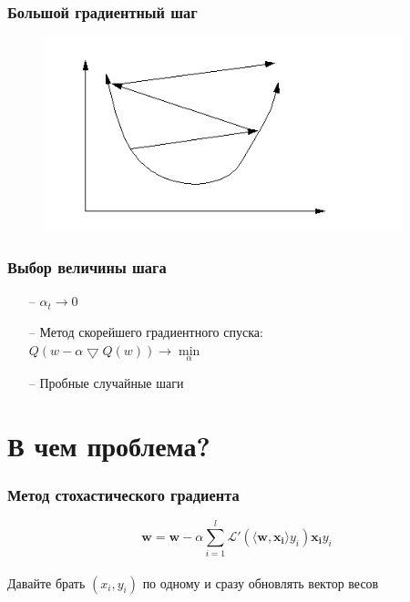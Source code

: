 \documentclass[10pt]{beamer}
\begin{document}
\begin{frame}\frametitle{Большой градиентный шаг}
	\begin{figure}[htbp]
	  \includegraphics[height=160pt, keepaspectratio = true]{images/learning_rate_large}
	\end{figure}
\end{frame}

\begin{frame}\frametitle{Выбор величины шага}
	\begin{itemize}
		\item[--] $\alpha_t \rightarrow 0$\\
		\item[--] Метод скорейшего градиентного спуска:\\
		$Q(w - \alpha \bigtriangledown Q(w)) \rightarrow \min\limits_{\alpha}$
		\item[--] Пробные случайные шаги
	\end{itemize}
\end{frame}

\section{В чем проблема?}

\begin{frame}\frametitle{Метод стохастического градиента}
	$$\mathbf{w} =  \mathbf{w} - \alpha \sum\limits_{i=1}^l \mathcal{L}'(\langle \mathbf{w}, \mathbf{x_i}\rangle y_i)\mathbf{x_i}y_i$$\\
	\bigbreak \pause
	Давайте брать $(x_i, y_i)$ по одному и сразу обновлять вектор весов
\end{frame}
\end{document}
